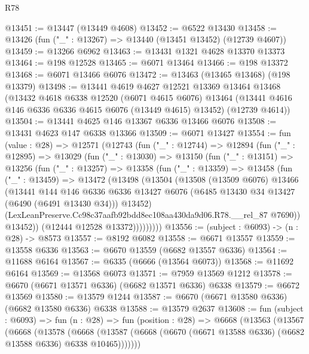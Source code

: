 \begin{lexlean}{R78}
\begin{coremodule}
@13451 := @13447 (@13449 @4608)
@13452 := @6522 @13430
@13458 := @13426 (fun ("_" : @13267) => @13440 (@13451 @13452) (@12739 @4607))
@13459 := @13266 @6962
@13463 := @13431 @1321 @4628 @13370 @13373
@13464 := @198 @12528
@13465 := @6071 @13464
@13466 := @198 @13372
@13468 := @6071 @13466 @6076
@13472 := @13463 (@13465 @13468) (@198 @13379)
@13498 := @13441
    @4619
    @4627
    @12521
    @13369
    @13464
    @13468
    (@13432
      @4618
      @6338
      @12520
      (@6071 @4615 @6076)
      @13464
      (@13441 @4616 @146 @6336 @6336 @4615 @6076 (@13449 @4615) @13452)
      (@12739 @4614))
@13504 := @13441 @4625 @146 @13367 @6336 @13466 @6076
@13508 := @13431 @4623 @147 @6338 @13366
@13509 := @6071 @13427
@13554 := fun (value : @28) =>
  @12571
    (@12743
      (fun ("_" : @12744) =>
      @12894
        (fun ("_" : @12895) =>
        @13029
          (fun ("_" : @13030) =>
          @13150
            (fun ("_" : @13151) =>
            @13256
              (fun ("_" : @13257) =>
              @13358
                (fun ("_" : @13359) =>
                @13458
                  (fun ("_" : @13459) =>
                  @13472
                    (@13498
                      (@13504
                        (@13508
                          (@13509 @6076)
                          @13466
                          (@13441
                            @144
                            @146
                            @6336
                            @6336
                            @13427
                            @6076
                            (@6485 @13430 @34 @13427 (@6490 (@6491 @13430 @34)))
                            @13452)
                          (LexLeanPreserve.Cc98c37aafb92bdd8ec108aa430da9d06.R78.__rel_87 @7690))
                        @13452))
                    (@12444 @12528 @13372)))))))))
@13556 := (subject : @6093) -> (n : @28) -> @8573
@13557 := @8192 @6082
@13558 := @6671 @13557
@13559 := @13558 @6336
@13563 := @6670 @13559 (@6682 @13557 @6336)
@13564 := @11688 @6164
@13567 := @6335 (@6666 (@13564 @6073))
@13568 := @11692 @6164
@13569 := @13568 @6073
@13571 := @7959 @13569 @1212
@13578 := @6670 (@6671 @13571 @6336) (@6682 @13571 @6336) @6338
@13579 := @6672 @13569
@13580 := @13579 @1244
@13587 := @6670 (@6671 @13580 @6336) (@6682 @13580 @6336) @6338
@13588 := @13579 @2637
@13608 := fun (subject : @6093) =>
  fun (n : @28) =>
  fun (position : @28) =>
  @6668
    (@13563
      (@13567
        (@6668
          (@13578
            (@6668
              (@13587 (@6668 (@6670 (@6671 @13588 @6336) (@6682 @13588 @6336) @6338 @10465)))))))

\end{coremodule}
\end{lexlean}
